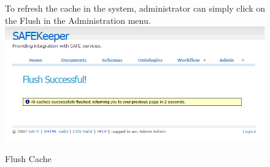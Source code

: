 \begin{figure}
To refresh the cache in the system, administrator can simply click on the Flush 
in the Administration menu.
\includegraphics[scale=0.4]{flush}
\caption{Flush Cache}
\label{fig:flush}
\end{figure}